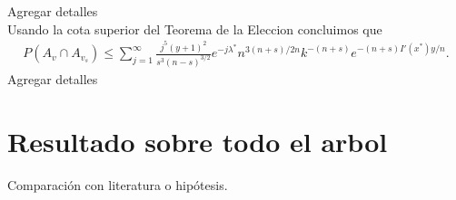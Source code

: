 \documentclass[12pt]{report}
\begin{document}
Agregar detalles \\
Usando la cota superior del Teorema de la Eleccion concluimos que
\begin{align}
    P(A_v \cap A_{v_s}) \leq \sum_{j=1}^{\infty} 
\frac{j^5 (y + 1)^2}{s^3 (n - s)^{3/2}} 
e^{-j \lambda^*} 
n^{3(n + s)/2n} 
k^{-(n + s)} 
e^{-(n + s) I'(x^*) y / n}.
\end{align}
Agregar detalles\\











\section{Resultado sobre todo el arbol}
Comparación con literatura o hipótesis.
\end{document}
